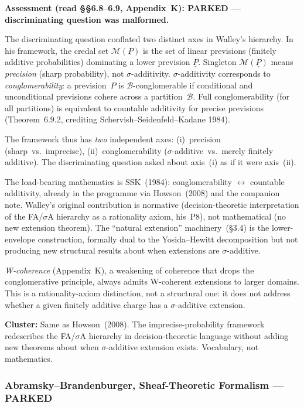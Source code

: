 \medskip\noindent\textbf{Assessment (read \S\S6.8--6.9, Appendix~K):
PARKED --- discriminating question was malformed.}

The discriminating question conflated two distinct axes in Walley's
hierarchy.  In his framework, the credal set
$\mathcal{M}(\underline{P})$ is the set of linear previsions
(finitely additive probabilities) dominating a lower prevision
$\underline{P}$.  Singleton $\mathcal{M}(\underline{P})$ means
\emph{precision} (sharp probability), not $\sigma$-additivity.
$\sigma$-additivity corresponds to \emph{conglomerability}: a
prevision~$P$ is $\mathcal{B}$-conglomerable if conditional and
unconditional previsions cohere across a partition~$\mathcal{B}$.
Full conglomerability (for all partitions) is equivalent to countable
additivity for precise previsions (Theorem~6.9.2, crediting
Schervish--Seidenfeld--Kadane 1984).

The framework thus has \emph{two} independent axes: (i)~precision
(sharp~vs.\ imprecise), (ii)~conglomerability ($\sigma$-additive~vs.\
merely finitely additive).  The discriminating question asked about
axis~(i) as if it were axis~(ii).

The load-bearing mathematics is SSK~(1984): conglomerability
$\leftrightarrow$ countable additivity, already in the programme via
Howson~(2008) and the companion note.  Walley's original contribution
is normative (decision-theoretic interpretation of the FA/$\sigma$A
hierarchy as a rationality axiom, his~P8), not mathematical (no new
extension theorem).  The ``natural extension'' machinery~(\S3.4) is
the lower-envelope construction, formally dual to the Yosida--Hewitt
decomposition but not producing new structural results about when
extensions are $\sigma$-additive.

\emph{W-coherence} (Appendix~K), a weakening of coherence that drops
the conglomerative principle, always admits W-coherent extensions to
larger domains.  This is a rationality-axiom distinction, not a
structural one: it does not address whether a given finitely additive
charge has a $\sigma$-additive extension.

\textbf{Cluster:} Same as Howson~(2008).  The imprecise-probability
framework redescribes the FA/$\sigma$A hierarchy in
decision-theoretic language without adding new theorems about when
$\sigma$-additive extension exists.  Vocabulary, not mathematics.

\subsubsection*{Abramsky--Brandenburger, Sheaf-Theoretic Formalism --- PARKED}

